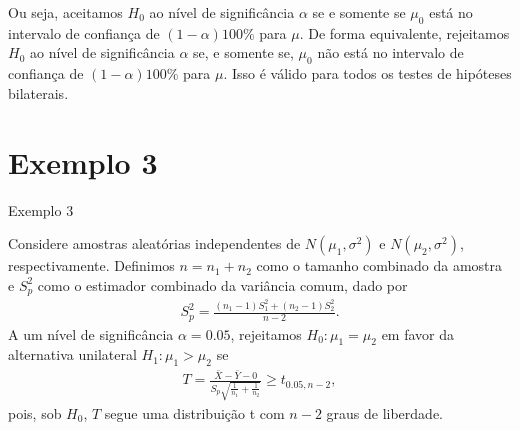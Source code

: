\documentclass[12pt]{beamer}
\begin{document}
\begin{frame}{}
\begin{block}{}
\justifying
Ou seja, aceitamos $H_0$ ao nível de significância $\alpha$ se e somente se $\mu_0$ está no intervalo de confiança de $(1 - \alpha)100\%$ para $\mu$. De forma equivalente, rejeitamos $H_0$ ao nível de significância $\alpha$ se, e somente se, $\mu_0$ não está no intervalo de confiança de $(1 - \alpha)100\%$ para $\mu$. Isso é válido para todos os testes de hipóteses bilaterais.
\end{block}
\end{frame}

\section{Exemplo 3}
\begin{frame}{Exemplo 3}
\vspace{-0.2cm}
\begin{block}{}
\justifying
Considere amostras aleatórias independentes de $N(\mu_1, \sigma^2)$ e $N(\mu_2, \sigma^2)$, respectivamente. Definimos $n = n_1 + n_2$ como o tamanho combinado da amostra e $S_{p}^2$ como o estimador combinado da variância comum, dado por
\begin{align*}
S_{p}^2 = \frac{(n_1 - 1)S_1^2 + (n_2 - 1)S_2^2}{n - 2}.
\end{align*}
A um nível de significância $\alpha = 0.05$, rejeitamos $H_0 : \mu_1 = \mu_2$ em favor da alternativa unilateral $H_1 : \mu_1 > \mu_2$ se
\begin{align*}
T = \frac{\bar{X} - \bar{Y} - 0}{S_p\sqrt{\frac{1}{n_1} + \frac{1}{n_2}}}  \geq t_{0.05, n-2},
\end{align*}
pois, sob $H_0$, $T$ segue uma distribuição t com $n - 2$ graus de liberdade.
\end{block}
\end{frame}
\end{document}
